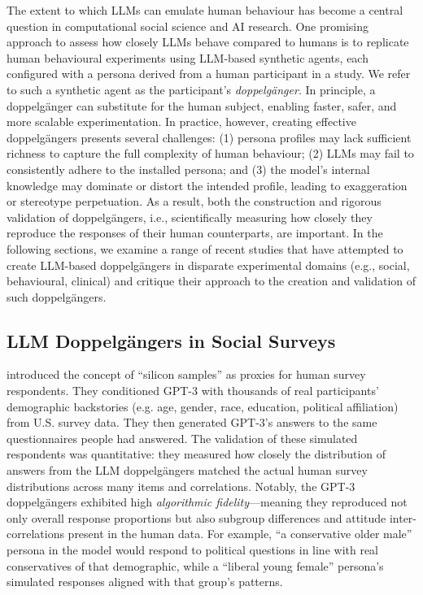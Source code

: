 The extent to which LLMs can emulate human behaviour has become a central question in computational social science and AI research. One promising approach to assess how closely LLMs behave compared to humans is to replicate human behavioural experiments using LLM-based synthetic agents, each configured with a persona derived from a human participant in a study. We refer to such a synthetic agent as the participant's \emph{doppelgänger}. In principle, a doppelgänger can substitute for the human subject, enabling faster, safer, and more scalable experimentation. In practice, however, creating effective doppelgängers presents several challenges: (1) persona profiles may lack sufficient richness to capture the full complexity of human behaviour; (2) LLMs may fail to consistently adhere to the installed persona; and (3) the model's internal knowledge may dominate or distort the intended profile, leading to exaggeration or stereotype perpetuation. As a result, both the construction and rigorous validation of doppelgängers, i.e., scientifically measuring how closely they reproduce the responses of their human counterparts, are important. In the following sections, we examine a range of recent studies that have attempted to create LLM-based doppelgängers in disparate experimental domains (e.g., social, behavioural, clinical) and critique their approach to the creation and validation of such doppelgängers.


\subsection*{LLM Doppelgängers in Social Surveys}
\citet{argyle2023} introduced the concept of ``silicon samples'' as proxies for human survey respondents. They conditioned GPT-3 with thousands of real participants' demographic backstories (e.g. age, gender, race, education, political affiliation) from U.S. survey data. They then generated GPT-3's answers to the same questionnaires people had answered. The validation of these simulated respondents was quantitative: they measured how closely the distribution of answers from the LLM doppelgängers matched the actual human survey distributions across many items and correlations. Notably, the GPT-3 doppelgängers exhibited high \textit{algorithmic fidelity}---meaning they reproduced not only overall response proportions but also subgroup differences and attitude inter-correlations present in the human data. For example, ``a conservative older male'' persona in the model would respond to political questions in line with real conservatives of that demographic, while a ``liberal young female'' persona’s simulated responses aligned with that group’s patterns.

